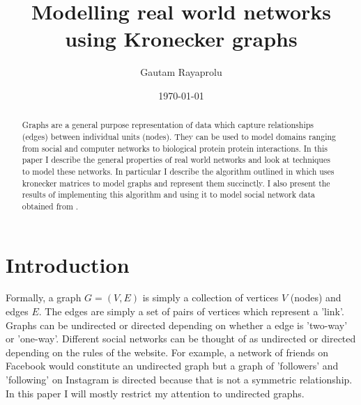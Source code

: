 \documentclass[dvips,12pt]{article}
\begin{document}

\title{Modelling real world networks using Kronecker graphs}
\author{Gautam Rayaprolu}
\date{\today}



\maketitle

\begin{abstract}
Graphs are a general purpose representation of data which capture relationships (edges) between individual units (nodes). They can be used to model domains ranging from social and computer networks to biological protein protein interactions. In this paper I describe the general properties of real world networks and look at techniques to model these networks. In particular I describe the algorithm outlined in \cite{ghahramani2010} which uses kronecker matrices to model graphs and represent them succinctly. I also present the results of implementing this algorithm and using it to model social network data obtained from \cite{SNAP-dataset}.
\end{abstract}



\section{Introduction}
Formally, a graph $G = (V,E)$ is simply a collection of vertices $V$ (nodes) and edges $E$. The edges are simply a set of pairs of vertices which represent a 'link'. Graphs can be undirected or directed depending on whether a edge is 'two-way' or 'one-way'. Different social networks can be thought of as undirected or directed depending on the rules of the website. For example, a network of friends on Facebook would constitute an undirected graph but a graph of 'followers' and 'following' on Instagram is directed because that is not a symmetric relationship. In this paper I will mostly restrict my attention to undirected graphs.
\end{document}
